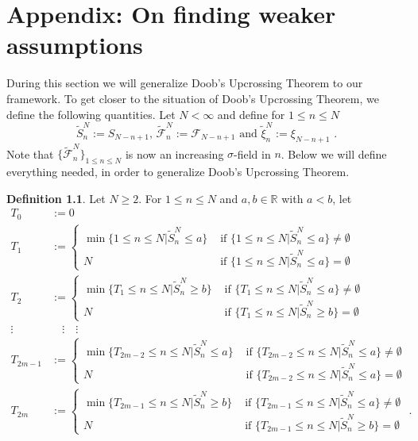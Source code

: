 \documentclass[phd]{UWMThesis}
\newcommand{\F}{\mathcal{F}}
\newcommand{\sn}[1]{S_{#1}}
\newcommand{\StN}[1]{\tilde{S}_{#1}^N}
\newcommand{\FtN}[1]{\tilde{\F}_{#1}^N}
\newcommand{\xitN}[1]{\tilde{\xi}_{#1}^N}
\newcommand{\mdot}{\textrm{ .}}
\renewcommand{\.}{\textrm{ .}}
\theoremstyle{definition}
\newtheorem{defn}[thm]{Definition}
\numberwithin{thm}{chapter}
\begin{document}
\chapter{Appendix: On finding weaker assumptions}
During this section we will generalize Doob's Upcrossing Theorem to our framework. To get closer to the situation of Doob's Upcrossing Theorem, we define the following quantities. Let $N<\infty$ and define for $1\leq n\leq N$ 
\begin{equation*}
\StN{n} := \sn{N-n+1} \textrm{, } \FtN{n} := \F_{N-n+1} \textrm{ \ and \ } \xitN{n} := \xi_{N-n+1}\mdot
\end{equation*}
Note that $\{\FtN{n}\}_{1\leq n\leq N}$ is now an increasing $\sigma$-field in $n$.
%
Below we will define everything needed, in order to generalize Doob's Upcrossing Theorem.
\begin{defn}
	Let $N\geq 2$. For $1\leq n\leq N$ and $a, b \in \mathbb{R}$ with $a < b$, let 
	\begin{align*}
	T_0 &:= 0\\
	T_1 &:= \begin{cases} 
	\min\{1\leq n\leq N | \StN{n}\leq a\} & \textrm{ if } \{1\leq n\leq N | \StN{n}\leq a\}\neq \emptyset\\
	N & \textrm{ if } \{1\leq n\leq N | \StN{n}\leq a\}= \emptyset
	\end{cases}\\	
	T_2 &:= \begin{cases} 
	\min\{T_1\leq n\leq N | \StN{n}\geq b\} & \textrm{ if } \{T_1\leq n\leq N | \StN{n}\leq a\}\neq \emptyset\\
	N & \textrm{ if } \{T_1\leq n\leq N | \StN{n}\geq b\} = \emptyset
	\end{cases}\\	
	\vdots &\quad \vdots \quad \vdots	\\
	T_{2m-1} &:= \begin{cases} 
	\min\{T_{2m-2}\leq n\leq N | \StN{n}\leq a\} & \textrm{ if } \{T_{2m-2}\leq n\leq N | \StN{n}\leq a\}\neq \emptyset\\
	N & \textrm{ if } \{T_{2m-2}\leq n\leq N | \StN{n}\leq a\}= \emptyset
	\end{cases}\\	
	T_{2m} &:= \begin{cases} 
	\min\{T_{2m-1}\leq n\leq N | \StN{n}\geq b\} & \textrm{ if } \{T_{2m-1}\leq n\leq N | \StN{n}\leq a\}\neq \emptyset\\
	N & \textrm{ if } \{T_{2m-1}\leq n\leq N | \StN{n}\geq b\} = \emptyset
	\end{cases}\mdot

\end{align*}
\end{defn}
\end{document}
